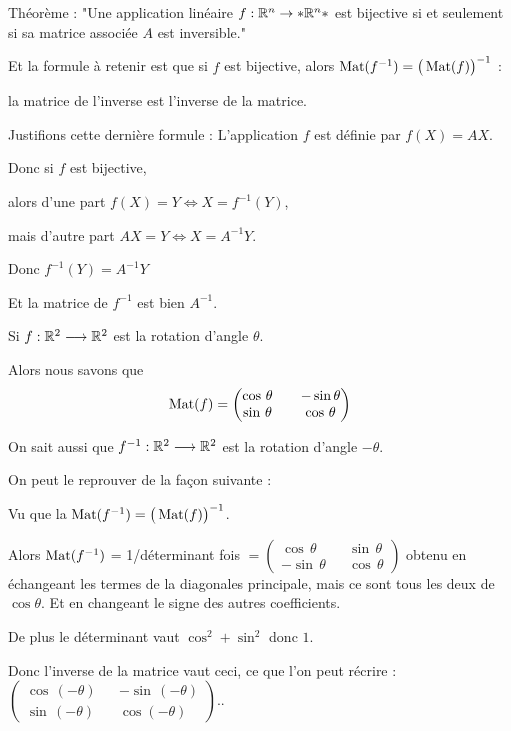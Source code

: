 Théorème : "Une application linéaire $f : \mathbb{R}^n \to *\mathbb{R}^n*$ est bijective
si et seulement si sa matrice associée $A$ 
 est inversible."
 
\change
Et la formule à retenir est que si $f$ est bijective, alors 
$\mathop{\mathrm{Mat}}\nolimits(f^{-1}) = \big(\mathop{\mathrm{Mat}}\nolimits (f) \big)^{-1}$ :

la matrice de l'inverse est l'inverse de la matrice.

\change
Justifions cette dernière formule :
L'application $f$ est définie par $f(X) = AX$.

\change
Donc si $f$ est bijective, 

\change
alors d'une part $f(X)=Y \iff X = f^{-1}(Y)$,

\change
mais d'autre part $AX=Y \iff X = A^{-1}Y$.

\change
Donc $f^{-1}(Y)=A^{-1}Y$

\change
Et la matrice de $f^{-1}$ est bien $A^{-1}$.

\diapo

Si $f: \mathbb{R}^2 \longrightarrow \mathbb{R}^2$ est la rotation d'angle $\theta$. 

\change
Alors nous savons que 
$$\mathop{\mathrm{Mat}}\nolimits(f) = 
\begin{pmatrix}
\cos\, \theta & & -\sin \theta\\
\sin\, \theta &&\cos\, \theta  
\end{pmatrix}$$

\change
On sait aussi que  $f^{-1}: \mathbb{R}^2 \longrightarrow \mathbb{R}^2$ est la rotation d'angle $-\theta$.

\change
On peut le reprouver de la façon suivante :

Vu que la $\mathop{\mathrm{Mat}}\nolimits(f^{-1}) = \big(\mathop{\mathrm{Mat}}\nolimits (f) \big)^{-1}$.

\change
Alors 
$\mathop{\mathrm{Mat}}\nolimits(f^{-1})$ = 1/déterminant fois $
= \begin{pmatrix}
\cos\, \theta &&\sin \,\theta\\
-\sin\, \theta && \cos\,\theta    
\end{pmatrix}$ obtenu en échangeant les termes de la diagonales principale,
mais ce sont tous les deux de $\cos \theta$. Et en changeant le signe des autres coefficients.

De plus le déterminant vaut $\cos^2 + \sin^2$ donc $1$.

Donc l'inverse de la matrice vaut ceci, ce que l'on peut récrire :
$\begin{pmatrix}
\cos\, (-\theta ) && -\sin\, (-\theta )\\
\sin\, (-\theta ) && \cos (-\theta )    
  \end{pmatrix}.
$.

